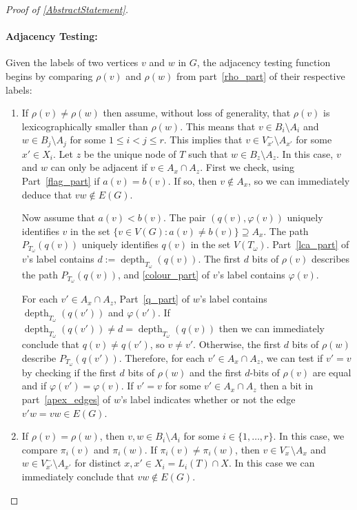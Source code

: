\documentclass{patmorin}
\DeclareMathOperator{\depth}{depth}
\renewcommand{\le}{\leqslant}
\begin{document}
\begin{proof}[Proof of \cref{AbstractStatement}]
    \paragraph{Adjacency Testing:}
    Given the labels of two vertices $v$ and $w$ in $G$, the adjacency testing function begins by comparing $\rho(v)$ and $\rho(w)$ from part~\ref{rho_part} of their respective labels:
    \begin{enumerate}
      \item If $\rho(v)\neq \rho(w)$ then assume, without loss of generality, that $\rho(v)$ is lexicographically smaller than $\rho(w)$.  This means that $v\in B_i\setminus A_i$ and $w\in B_j\setminus A_j$ for some $1\le i < j\le r$.  This implies that $v\in V^-_{x'}\setminus A_{x'}$ for some $x'\in X_i$. Let $z$ be the unique node of $T$ such that $w\in B_z\setminus A_z$.   In this case, $v$ and $w$ can only be adjacent if $v\in A_x\cap A_z$. First we check, using Part~\ref{flag_part} if $a(v)=b(v)$. If so, then $v\not\in A_x$, so we can immediately deduce that $vw\not\in E(G)$.

      Now assume that $a(v)<b(v)$.  The pair $(q(v),\varphi(v))$ uniquely identifies $v$ in the set $\{v\in V(G):a(v)\neq b(v)\}\supseteq A_x$.  The path $P_{T_\omega}(q(v))$ uniquely identifies $q(v)$ in the set $V(T_\omega)$.  Part~\ref{lca_part} of $v$'s label contains $d:=\depth_{T_\omega}(q(v))$.  The first $d$ bits of $\rho(v)$ describes the path $P_{T_\omega}(q(v))$, and \ref{colour_part} of $v$'s label contains $\varphi(v)$.

      For each $v'\in A_x\cap A_z$, Part~\ref{q_part} of $w$'s label contains $\depth_{T_\omega}(q(v'))$ and $\varphi(v')$.  If $\depth_{T_\omega}(q(v'))\neq d=\depth_{T_\omega}(q(v))$ then we can immediately conclude that $q(v)\neq q(v')$, so $v\neq v'$.  Otherwise, the first $d$ bits of $\rho(w)$ describe $P_{T_\omega}(q(v'))$.  Therefore, for each $v'\in A_x\cap A_z$, we can test if $v'=v$ by checking if the first $d$ bits of $\rho(w)$ and the first $d$-bits of $\rho(v)$ are equal and if $\varphi(v')=\varphi(v)$.  If $v'=v$ for some $v'\in A_x\cap A_z$ then a bit in part~\ref{apex_edges} of $w$'s label indicates whether or not the edge $v'w=vw\in E(G)$.

      \item If $\rho(v) = \rho(w)$, then $v,w\in B_i\setminus A_i$ for some $i\in\{1,\ldots,r\}$.  In this case, we compare $\pi_i(v)$ and $\pi_i(w)$.  If $\pi_i(v)\neq\pi_i(w)$, then $v\in V^-_x\setminus A_x$ and $w\in V^-_{x'}\setminus A_{x'}$ for distinct $x,x'\in X_i=L_i(T)\cap X$.  In this case we can immediately conclude that $vw\not\in E(G)$.


\end{enumerate}
\end{proof}
\end{document}
